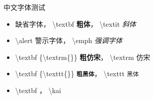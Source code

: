 \begin{frame}{中文字体测试}
    \begin{itemize} %
        \item 缺省字体，
            \textbackslash textbf \textbf{粗体}，
            \textbackslash textit \textit{斜体}
        \item \textbackslash alert \alert{警示字体}，
            \textbackslash emph \emph{强调字体}
        \item \textbackslash textbf \{\textbackslash textrm\{\}\}
            \textbf{\textrm{粗仿宋}}，
            \textbackslash textrm \textrm{仿宋}
        \item \textbackslash textbf \{\textbackslash texttt\{\}\}
            \textbf{\texttt{粗黑体}}，
            \textbackslash texttt \texttt{黑体}
        \item \textbackslash textbf \textbf{}，
            \textbackslash kai 
    \end{itemize}
\end{frame}
